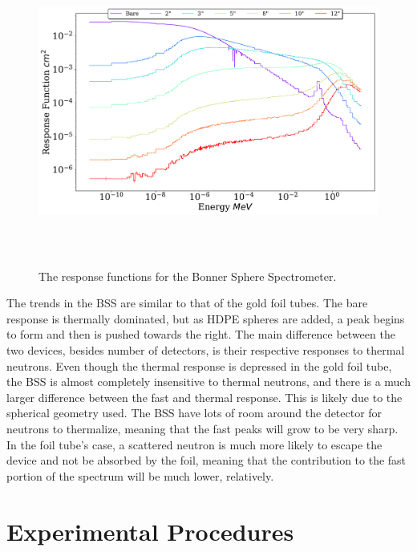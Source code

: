 \begin{figure}[htb]
\centering
\includegraphics[height=4in]{tex/figures/bs.pdf}
\caption[Bonner Sphere Spectrometer Response Functions]{The response functions for the Bonner Sphere Spectrometer.}
\label{fig:bs_rfs}
\end{figure}

The trends in the BSS are similar to that of the gold foil tubes.
The bare response is thermally dominated, but as HDPE spheres are added, a peak begins to form and then is pushed towards the right.
The main difference between the two devices, besides number of detectors, is their respective responses to thermal neutrons.
Even though the thermal response is depressed in the gold foil tube, the BSS is almost completely insensitive to thermal neutrons, and there is a much larger difference between the fast and thermal response.
This is likely due to the spherical geometry used.
The BSS have lots of room around the detector for neutrons to thermalize, meaning that the fast peaks will grow to be very sharp.
In the foil tube's case, a scattered neutron is much more likely to escape the device and not be absorbed by the foil, meaning that the contribution to the fast portion of the spectrum will be much lower, relatively.

\section{Experimental Procedures}


